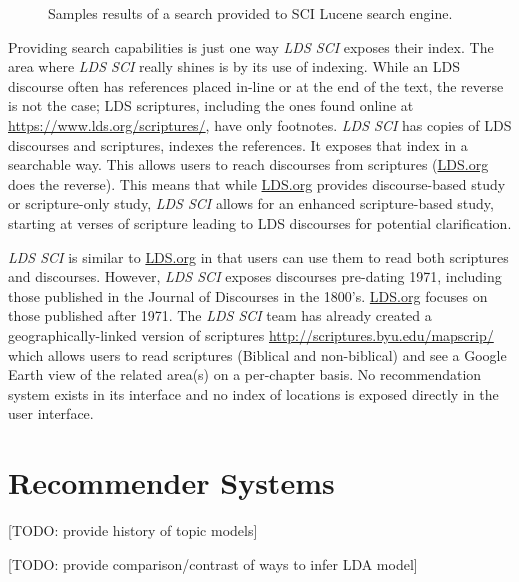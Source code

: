 \begin{figure}[hhhhhtb]
	\centering
		\caption[SCI \emph{TF-IDF} Search Results]{
			Samples results of a search provided to SCI Lucene search engine.
		}
	\label{fig:sci_search}
\end{figure}

Providing search capabilities is just one way \emph{LDS SCI} exposes their index. The area where \emph{LDS SCI} really shines is by its use of indexing. While an LDS discourse often has references placed in-line or at the end of the text, the reverse is not the case; LDS scriptures, including the ones found online at \url{https://www.lds.org/scriptures/}, have only footnotes. \emph{LDS SCI} has copies of LDS discourses and scriptures, indexes the references. It exposes that index in a searchable way. This allows users to reach discourses from scriptures (\url{LDS.org} does the reverse). This means that while \url{LDS.org} provides discourse-based study or scripture-only study, \emph{LDS SCI} allows for an enhanced scripture-based study, starting at verses of scripture leading to LDS discourses for potential clarification.

\emph{LDS SCI} is similar to \url{LDS.org} in that users can use them to read both scriptures and discourses. However, \emph{LDS SCI} exposes discourses pre-dating 1971, including those published in the Journal of Discourses in the 1800’s. \url{LDS.org} focuses on those published after 1971. The \emph{LDS SCI} team has already created a geographically-linked version of scriptures \url{http://scriptures.byu.edu/mapscrip/} which allows users to read scriptures (Biblical and non-biblical) and see a Google Earth view of the related area(s) on a per-chapter basis. No recommendation system exists in its interface and no index of locations is exposed directly in the user interface.




\section{Recommender Systems}

[TODO: provide history of topic models]

[TODO: provide comparison/contrast of ways to infer LDA model]

